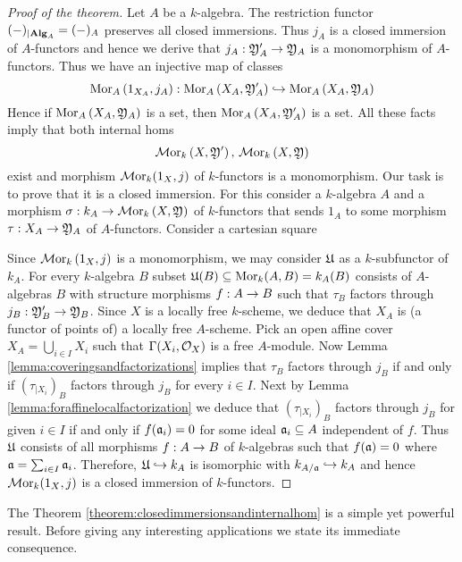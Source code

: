 \begin{proof}[Proof of the theorem]
Let $A$ be a $k$-algebra. The restriction functor $(-)_{\mid \mathbf{Alg}_A} = (-)_A$ preserves all closed immersions. Thus $j_A$ is a closed immersion of $A$-functors and hence we derive that $j_A:{\mathfrak Y}'_A\rightarrow {\mathfrak Y}_A$ is a monomorphism of $A$-functors. Thus we have an injective  map of classes
$$\mathrm{Mor}_A\left(1_{X_A},j_A\right):\mathrm{Mor}_A\left(X_A,{\mathfrak Y}'_A\right)\hookrightarrow \mathrm{Mor}_A\left(X_A,{\mathfrak Y}_A\right)$$
Hence if $\mathrm{Mor}_A\left(X_A,{\mathfrak Y}_A\right)$ is a set, then $\mathrm{Mor}_A\left(X_A,{\mathfrak Y}'_A\right)$ is a set. All these facts imply that both internal homs
$$\mathcal{M}\mathrm{or}_k\left(X,{\mathfrak Y}'\right),\,\mathcal{M}\mathrm{or}_k\left(X,{\mathfrak Y}\right)$$
exist and morphism $\mathcal{M}\mathrm{or}_k(1_X,j)$ of $k$-functors is a monomorphism. Our task is to prove that it is a closed immersion. For this consider a $k$-algebra $A$ and a morphism $\sigma:k_A\rightarrow \mathcal{M}\mathrm{or}_k\left(X,{\mathfrak Y}\right)$ of $k$-functors that sends $1_A$ to some morphism $\tau:X_A\rightarrow {\mathfrak Y}_A$ of $A$-functors. Consider a cartesian square
\begin{center}
\end{center}
Since $\mathcal{M}\mathrm{or}_k\left(1_X,j\right)$ is a monomorphism, we may consider ${\mathfrak U}$ as a $k$-subfunctor of $k_A$. For every $k$-algebra $B$ subset ${\mathfrak U}(B)\subseteq \mathrm{Mor}_k(A,B)= k_A(B)$ consists of $A$-algebras $B$ with structure morphisms $f:A\rightarrow B$ such that $\tau_B$ factors through $j_B:{\mathfrak Y}'_B\rightarrow {\mathfrak Y}_B$. Since $X$ is a locally free $k$-scheme, we deduce that $X_A$ is (a functor of points of) a locally free $A$-scheme. Pick an open affine cover $X_A = \bigcup_{i\in I}X_i$ such that $\Gamma(X_i,{\mathcal O}_X)$ is a free $A$-module. Now Lemma \ref{lemma:coveringsandfactorizations} implies that $\tau_B$ factors through $j_B$ if and only if $\left(\tau_{\mid X_i}\right)_B$ factors through $j_B$ for every $i\in I$. Next by Lemma \ref{lemma:foraffinelocalfactorization} we deduce that $\left(\tau_{\mid X_i}\right)_B$  factors through $j_B$ for given $i\in I$ if and only if $f(\mathfrak{a}_i)=0$ for some ideal $\mathfrak{a}_i\subseteq A$ independent of $f$. Thus ${\mathfrak U}$ consists of all morphisms $f:A\rightarrow B$ of $k$-algebras such that $f(\mathfrak{a})=0$ where $\mathfrak{a} = \sum_{i\in I}\mathfrak{a}_i$. Therefore, ${\mathfrak U}\hookrightarrow k_A$ is isomorphic with $k_{A/\mathfrak{a}}\hookrightarrow k_A$ and hence $\mathcal{M}\mathrm{or}_k(1_X,j)$ is a closed immersion of $k$-functors.
\end{proof}
\noindent
The Theorem \ref{theorem:closedimmersionsandinternalhom} is a simple yet powerful result. Before giving any interesting applications we state its immediate consequence.

